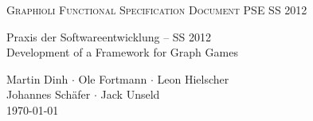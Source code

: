 \begin{titlepage}
\begin{center}
\fontsize{40}{50}\selectfont
        \vfill
        \textsc{Graphioli}
		\vfill
        \textsc{Functional Specification Document}
        \vfill
\LARGE
PSE SS 2012
  \vfill
 \newpage
 
 \null
 \vfill
 
 Praxis der Softwareentwicklung -- SS 2012 \\
 
  \Large
  Development of a Framework for Graph Games \\
  \medskip
  \vspace{2cm}
  
    Martin Dinh $\cdot$ Ole Fortmann $\cdot$ Leon Hielscher \\ Johannes Schäfer $\cdot$ Jack Unseld
  \vspace{2cm} \\
  \today
\end{center}

  \vfill

\end{titlepage}